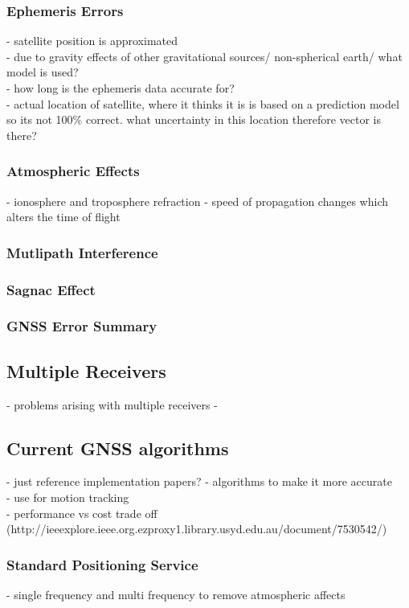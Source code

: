 \documentclass[11pt,a4paper]{article}
\begin{document}
\subsubsection{Ephemeris Errors}
- satellite position is approximated\\
- due to gravity effects of other gravitational sources/ non-spherical earth/ what model is used?\\
- how long is the ephemeris data accurate for?\\
- actual location of satellite, where it thinks it is is based on a prediction model so its not 100\% correct. what uncertainty in this location therefore vector is there?

\subsubsection{Atmospheric Effects}
- ionosphere and troposphere refraction - speed of propagation changes which alters the time of flight
\subsubsection{Mutlipath Interference}


\subsubsection{Sagnac Effect}

\subsubsection{GNSS Error Summary}


\subsection{Multiple Receivers}
- problems arising with multiple receivers
- 

\subsection{Current GNSS algorithms}
- just reference implementation papers?
- algorithms to make it more accurate\\
- use for motion tracking\\
- performance vs cost trade off\\
(http://ieeexplore.ieee.org.ezproxy1.library.usyd.edu.au/document/7530542/)
\subsubsection{Standard Positioning Service}
- single frequency and multi frequency to remove atmospheric affects
\end{document}
